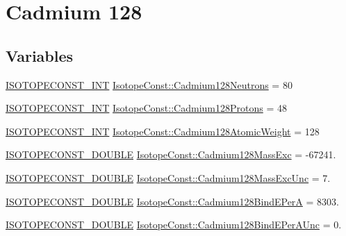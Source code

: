 \hypertarget{group___isotope_const-_cadmium-_cd128}{}\section{Cadmium 128}
\label{group___isotope_const-_cadmium-_cd128}
\subsection*{Variables}
\begin{DoxyCompactItemize}
\item 
\mbox{\hyperlink{group___isotope_const-_macros_ga5f18360b3e99483a35c32d789e62621c}{I\+S\+O\+T\+O\+P\+E\+C\+O\+N\+S\+T\+\_\+\+I\+NT}} \mbox{\hyperlink{group___isotope_const-_cadmium-_cd128_ga3cb1fce2c4b9674933c5c569366e28cb}{Isotope\+Const\+::\+Cadmium128\+Neutrons}} = 80
\item 
\mbox{\hyperlink{group___isotope_const-_macros_ga5f18360b3e99483a35c32d789e62621c}{I\+S\+O\+T\+O\+P\+E\+C\+O\+N\+S\+T\+\_\+\+I\+NT}} \mbox{\hyperlink{group___isotope_const-_cadmium-_cd128_gaf98cd1c12082ffbfab35e7e8e0a6b1d8}{Isotope\+Const\+::\+Cadmium128\+Protons}} = 48
\item 
\mbox{\hyperlink{group___isotope_const-_macros_ga5f18360b3e99483a35c32d789e62621c}{I\+S\+O\+T\+O\+P\+E\+C\+O\+N\+S\+T\+\_\+\+I\+NT}} \mbox{\hyperlink{group___isotope_const-_cadmium-_cd128_ga4ebe14a207b4e149cd0bfc7fd31a190b}{Isotope\+Const\+::\+Cadmium128\+Atomic\+Weight}} = 128
\item 
\mbox{\hyperlink{group___isotope_const-_macros_ga8f45a7272ce02c0b4c65c44636ed719a}{I\+S\+O\+T\+O\+P\+E\+C\+O\+N\+S\+T\+\_\+\+D\+O\+U\+B\+LE}} \mbox{\hyperlink{group___isotope_const-_cadmium-_cd128_gaf814c95fb1ae8e9abec29b64c6a37596}{Isotope\+Const\+::\+Cadmium128\+Mass\+Exc}} = -\/67241.
\item 
\mbox{\hyperlink{group___isotope_const-_macros_ga8f45a7272ce02c0b4c65c44636ed719a}{I\+S\+O\+T\+O\+P\+E\+C\+O\+N\+S\+T\+\_\+\+D\+O\+U\+B\+LE}} \mbox{\hyperlink{group___isotope_const-_cadmium-_cd128_ga3c581343cf114a6d01fcab763ed17840}{Isotope\+Const\+::\+Cadmium128\+Mass\+Exc\+Unc}} = 7.
\item 
\mbox{\hyperlink{group___isotope_const-_macros_ga8f45a7272ce02c0b4c65c44636ed719a}{I\+S\+O\+T\+O\+P\+E\+C\+O\+N\+S\+T\+\_\+\+D\+O\+U\+B\+LE}} \mbox{\hyperlink{group___isotope_const-_cadmium-_cd128_ga03c7cc4a5c7e40e69e13708201085f54}{Isotope\+Const\+::\+Cadmium128\+Bind\+E\+PerA}} = 8303.
\item 
\mbox{\hyperlink{group___isotope_const-_macros_ga8f45a7272ce02c0b4c65c44636ed719a}{I\+S\+O\+T\+O\+P\+E\+C\+O\+N\+S\+T\+\_\+\+D\+O\+U\+B\+LE}} \mbox{\hyperlink{group___isotope_const-_cadmium-_cd128_ga0e56d4dd5931da42b5274ca47d7b7ba4}{Isotope\+Const\+::\+Cadmium128\+Bind\+E\+Per\+A\+Unc}} = 0.

\end{DoxyCompactItemize}
